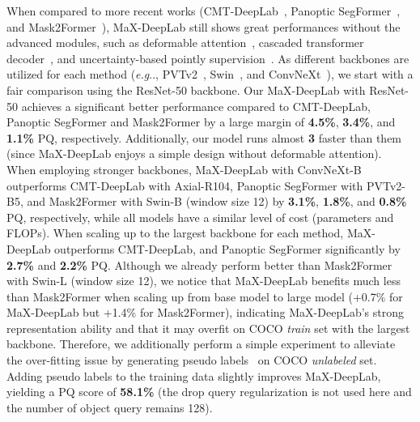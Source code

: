 \documentclass[runningheads]{llncs}
\makeatletter
\DeclareRobustCommand\onedot{\futurelet\@let@token\@onedot}
\def\@onedot{\ifx\@let@token.\else.\null\fi\xspace}
\def\eg{\emph{e.g}\onedot} \def\Eg{\emph{E.g}\onedot}
\makeatother
\begin{document}
When compared to more recent works (CMT-DeepLab~\cite{yu2022cmt}, Panoptic SegFormer~\cite{li2021panoptic}, and Mask2Former~\cite{cheng2021masked}), MaX-DeepLab still shows great performances without the advanced modules, such as deformable attention~\cite{zhu2020deformable}, cascaded transformer decoder~\cite{cheng2021masked}, and uncertainty-based pointly supervision~\cite{kirillov2020pointrend}. As different backbones are utilized for each method (\eg, PVTv2~\cite{wang2021pvtv2}, Swin~\cite{liu2021swin}, and ConvNeXt~\cite{liu2022convnet}), we start with a fair comparison using the ResNet-50 backbone. Our MaX-DeepLab with ResNet-50 achieves a significant better performance compared to CMT-DeepLab, Panoptic SegFormer and Mask2Former  by a large margin of \textbf{4.5\%}, \textbf{3.4\%}, and \textbf{1.1\%} PQ, respectively.
Additionally, our model runs almost \textbf{3} faster than them (since MaX-DeepLab enjoys a simple design without deformable attention).
When employing stronger backbones, MaX-DeepLab with ConvNeXt-B outperforms CMT-DeepLab with Axial-R104, Panoptic SegFormer with PVTv2-B5, and Mask2Former with Swin-B (window size 12) by \textbf{3.1\%}, \textbf{1.8\%}, and \textbf{0.8\%} PQ, respectively, while all models have a similar level of cost (parameters and FLOPs).
When scaling up to the largest backbone for each method, MaX-DeepLab outperforms CMT-DeepLab, and Panoptic SegFormer significantly by \textbf{2.7\%} and \textbf{2.2\%} PQ.
Although we already perform better than Mask2Former with Swin-L (window size 12), we notice that MaX-DeepLab benefits much less than Mask2Former when scaling up from base model to large model (+0.7\% for MaX-DeepLab but +1.4\% for Mask2Former), indicating MaX-DeepLab's strong representation ability and that it may overfit on COCO \textit{train} set with the largest backbone.
Therefore, we additionally perform a simple experiment to alleviate the over-fitting issue by generating pseudo labels~\cite{chen2020naive} on COCO \textit{unlabeled} set.
Adding pseudo labels to the training data slightly improves MaX-DeepLab, yielding a PQ score of \textbf{58.1\%} (the drop query regularization is not used here and the number of object query remains 128).
\end{document}
